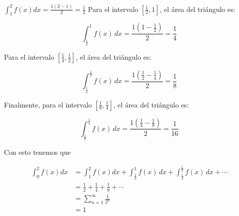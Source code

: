 \documentclass{report}
\begin{document}
\begin{enumerate}[label=\textcolor{NavyBlue}{\textbf{\arabic*.}}]
\begin{enumerate}[label=\textcolor{NavyBlue}{\textbf{\roman*.}}]
                $\int_{1}^{2}f(x)dx = \frac{1(2-1)}{2} = \frac{1}{2}$
                Para el intervalo $[\frac{1}{2}, 1]$, el área del triángulo es:

                \[
                \int_{\frac{1}{2}}^{1} f(x) \, dx = \frac{1 (1-\frac{1}{2})}{2} = \frac{1}{4}
                \]

                Para el intervalo $[\frac{1}{4}, \frac{1}{2}]$, el área del triángulo es:

                \[
                \int_{\frac{1}{4}}^{\frac{1}{2}} f(x) \, dx = \frac{1 (\frac{1}{2}-\frac{1}{4})}{2} = \frac{1}{8}
                \]

                Finalmente, para el intervalo $[\frac{1}{8}, \frac{1}{4}]$, el área del triángulo es:

                \[
                \int_{\frac{1}{8}}^{\frac{1}{4}} f(x) \, dx = \frac{1 (\frac{1}{4}-\frac{1}{8})}{2} = \frac{1}{16}
                \]

                Con esto tenemos que

                \begin{align*}
                    \int_{0}^{2} f(x)dx &= \int_{1}^{2}f(x)dx + \int_{\frac{1}{2}}^{1}f(x)\,dx + \int_{\frac{1}{4}}^{\frac{1}{2}}f(x)\,dx + \cdots\\
                    &= \frac{1}{2} + \frac{1}{4} + \frac{1}{8} + \cdots\\
                    &= \sum_{n=1}^{\infty}\frac{1}{2^n}\\
                    &= 1
                \end{align*}
            \end{enumerate}


\end{enumerate}
\end{document}
